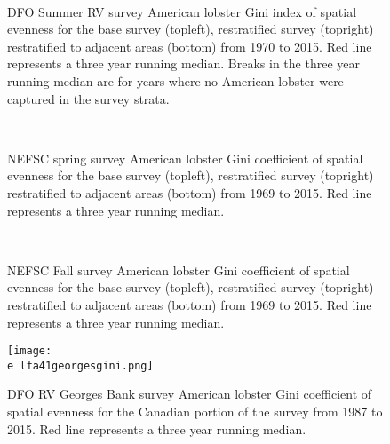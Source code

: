 \documentclass[11pt]{article}
\newcommand{\e}{/backup/bio_data/bio.lobster/figures/} %
\begin{document}
\begin{figure}
\centering
{}
\\
\caption{DFO Summer RV survey American lobster Gini index of spatial evenness for the base survey (topleft), restratified survey (topright) restratified to adjacent areas (bottom) from 1970 to 2015. Red line represents a three year running median. Breaks in the three year running median are for years where no American lobster were captured in the survey strata.}
\end{figure}
\clearpage


\begin{figure}
\centering
{}
\\
\caption{NEFSC spring survey American lobster Gini coefficient of spatial evenness for the base survey (topleft), restratified survey (topright) restratified to adjacent areas (bottom) from 1969 to 2015. Red line represents a three year running median.  }
\end{figure}
\clearpage



\begin{figure}
\centering
{}
\\
\caption{NEFSC Fall survey American lobster Gini coefficient of spatial evenness for the base survey (topleft), restratified survey (topright) restratified to adjacent areas (bottom) from 1969 to 2015. Red line represents a three year running median.  }
\end{figure}
\clearpage


\begin{figure}

    \texttt{[image: \\e lfa41georgesgini.png]}
    \caption{DFO RV Georges Bank survey American lobster Gini coefficient of spatial evenness for the Canadian portion of the survey from 1987 to 2015. Red line represents a three year running median. }

\end{figure}
\end{document}
